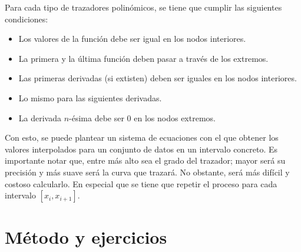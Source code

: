 \documentclass[12pt,oneside,FLEQN]{report}
\begin{document}
{Para cada tipo de trazadores polinómicos, se tiene que cumplir las siguientes condiciones:
\begin{itemize}
	\item Los valores de la función debe ser igual en los nodos interiores.
	\item La primera y la última función deben pasar a través de los extremos.
	\item Las primeras derivadas (si extisten) deben ser iguales en los nodos interiores.
	\item Lo mismo para las siguientes derivadas.
	\item La derivada $n$-ésima debe ser 0 en los nodos extremos.
\end{itemize}
Con esto, se puede plantear un sistema de ecuaciones con el que obtener los valores interpolados para un conjunto de datos en un intervalo concreto. Es importante notar que, entre más alto sea el grado del trazador; mayor será su precisión y más suave será la curva que trazará. No obstante, será más difícil y costoso calcularlo. En especial que se tiene que repetir el proceso para cada intervalo $[x_{i},x_{i+1}]$.
\chapter{Método y ejercicios}
}
\end{document}
